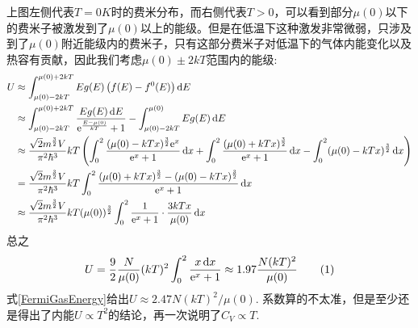 \documentclass[]{article}
\begin{document}
	上图左侧代表$ T=0\unit{K} $时的费米分布，而右侧代表$ T>0 $，可以看到部分$ \mu(0) $以下的费米子被激发到了$ \mu(0) $以上的能级。但是在低温下这种激发非常微弱，只涉及到了$ \mu(0) $附近能级内的费米子，只有这部分费米子对低温下的气体内能变化以及热容有贡献，因此我们考虑$ \mu(0)\pm2kT $范围内的能级:
	\begin{align*}
	U&\approx\int_{\mu(0)-2kT}^{\mu(0)+2kT}Eg(E)\left(f(E)-f^0(E)\right)\diff E\\
	&\approx\int_{\mu(0)-2kT}^{\mu(0)+2kT}\frac{Eg(E)\diff E}{\ee^{\frac{E-\mu(0)}{kT}}+1}-\int_{\mu(0)-2kT}^{\mu(0)}Eg(E)\diff E\\
	&\approx \frac{\sqrt{2}m^{\frac 32}V}{\pi^2\hbar^3}kT\left(\int_{0}^{2}\frac{(\mu(0)-kTx)^{\frac 32}\ee^x}{\ee^x+1}\diff x+\int_0^2\frac{(\mu(0)+kTx)^{\frac 32}}{\ee^x+1}\diff x-\int_0^2(\mu(0)-kTx)^{\frac 32}\diff x\right)\\
	&=\frac{\sqrt{2}m^{\frac 32}V}{\pi^2\hbar^3}kT\int_0^2\frac{(\mu(0)+kTx)^{\frac 32}-(\mu(0)-kTx)^{\frac 32}}{\ee^x+1}\diff x\\
	&\approx\frac{\sqrt{2}m^{\frac 32}V}{\pi^2\hbar^3}kT(\mu(0))^{\frac 32}\int_0^2\frac{1}{\ee^x+1}\cdot\frac{3kTx}{\mu(0)}\diff x
	\end{align*}
	总之
	\[U=\frac 92\frac{N}{\mu(0)}(kT)^2\int_0^2\frac{x\diff x}{\ee^x+1}\approx1.97\frac{N(kT)^2}{\mu(0)}\taghere\]
	式\eqref{FermiGasEnergy}给出$ U\approx2.47N(kT)^2/\mu(0) $. 系数算的不太准，但是至少还是得出了内能$ U\propto T^2 $的结论，再一次说明了$ C_V\propto T $.
\end{document}
